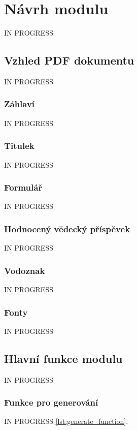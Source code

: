 \chapter{Návrh modulu}
IN PROGRESS

\section{Vzhled PDF dokumentu}
IN PROGRESS

\subsection{Záhlaví}
IN PROGRESS

\subsection{Titulek}
IN PROGRESS

\subsection{Formulář}
IN PROGRESS

\subsection{Hodnocený vědecký příspěvek}
IN PROGRESS

\subsection{Vodoznak}
IN PROGRESS

\subsection{Fonty}
IN PROGRESS


\section{Hlavní funkce modulu}
IN PROGRESS

\subsection{Funkce pro generování}
IN PROGRESS \ref{lst:generate_function}.

